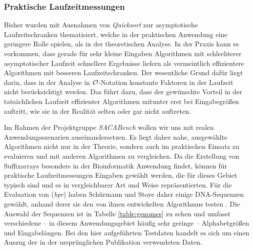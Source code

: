 \subsubsection{Praktische Laufzeitmessungen}
\label{bpr:effizienz:praxis}

Bisher wurden mit Ausnahmen von \emph{Quicksort} nur asymptotische Laufzeitschranken thematisiert, welche in der praktischen Anwendung eine geringere Rolle spielen, als in der theoretischen Analyse.
In der Praxis kann es vorkommen, dass gerade für sehr kleine Eingaben Algorithmen mit schlechterer asymptotischer Laufzeit schnellere Ergebnisse liefern als vermeintlich effizientere Algorithmen mit besseren Laufzeitschranken.
Der wesentliche Grund dafür liegt darin, dass in der Analyse in \(\mathcal{O}\)-Notation konstante Faktoren in der Laufzeit nicht berücksichtigt werden. Das führt dazu, dass der gewünschte Vorteil in der tatsächlichen Laufzeit effizienter Algorithmen mitunter erst bei Eingabegrößen auftritt, wie sie in der Realität selten oder gar nicht auftreten.\par\smallskip
Im Rahmen der Projektgruppe \emph{SACABench} wollen wir uns mit realen Anwendungsszenarien auseinandersetzen. Es liegt daher nahe, ausgewählte Algorithmen nicht nur in der Theorie, sondern auch im praktischen Einsatz zu evaluieren und mit anderen Algorithmen zu vergleichen. Da die Erstellung von Suffixarrays besonders in der Bioinformatik Anwendung findet, können für praktische Laufzeitmessungen Eingaben gewählt werden, die für dieses Gebiet typisch sind und es in vergleichbarer Art und Weise repräsentierten. Für die Evaluation von \bpr (\emph{bpr}) haben Schürmann und Stoye daher einige DNA-Sequenzen gewählt, anhand derer sie den von ihnen entwickelten Algorithmus testen \cite[Kapitel~4]{saca:2}. Die Auswahl der Sequenzen ist in Tabelle \ref{table:genomes} zu sehen und umfasst verschiedene -- in diesem Anwendungsgebiet häufig sehr geringe -- Alphabetgrößen und Eingabelängen. Bei den hier aufgeführten Testdaten handelt es sich um einen Auszug der in der ursprünglichen Publikation verwendeten Daten.\par
